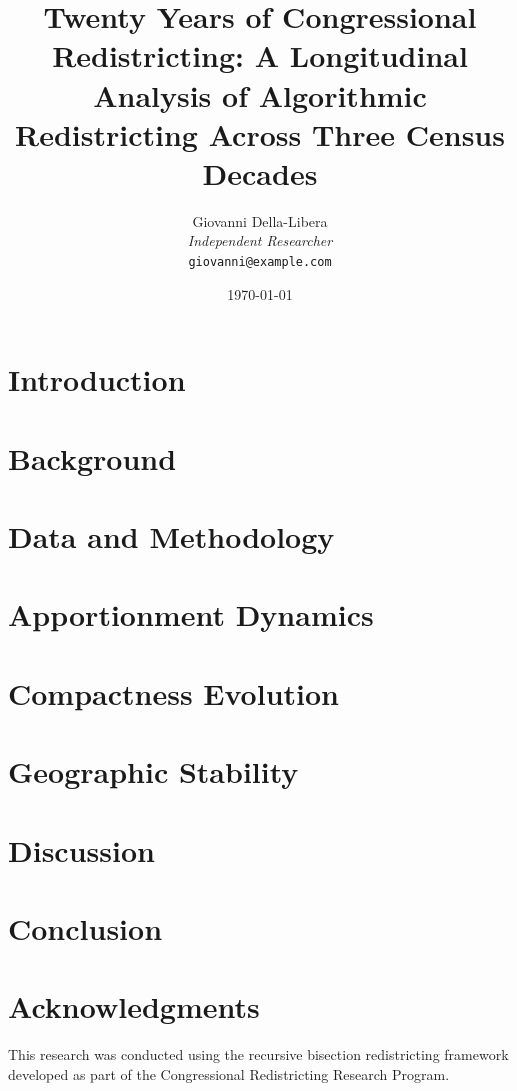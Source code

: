 \documentclass[11pt]{article}
\title{Twenty Years of Congressional Redistricting: A Longitudinal Analysis of Algorithmic Redistricting Across Three Census Decades}
\author{
    Giovanni Della-Libera \\
    \textit{Independent Researcher} \\
    \texttt{giovanni@example.com}
}
\date{\today}
\begin{document}
\maketitle

\begin{abstract}

\end{abstract}

\section{Introduction}


\section{Background}


\section{Data and Methodology}


\section{Apportionment Dynamics}


\section{Compactness Evolution}


\section{Geographic Stability}


\section{Discussion}


\section{Conclusion}


\section*{Acknowledgments}
This research was conducted using the recursive bisection redistricting framework developed as part of the Congressional Redistricting Research Program.
\end{document}
